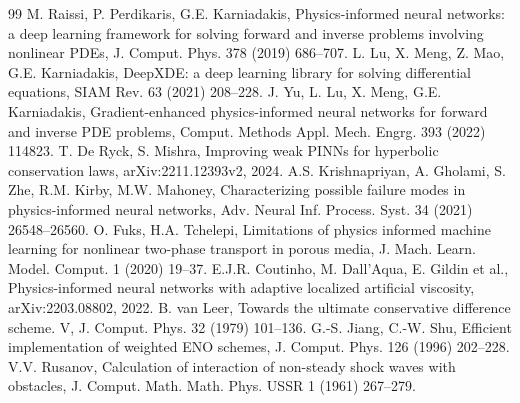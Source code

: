 \documentclass[11pt]{article}
\begin{document}
\begin{thebibliography}{99}
 M. Raissi, P. Perdikaris, G.E. Karniadakis, Physics-informed neural networks: a deep learning framework for solving forward and inverse problems involving nonlinear PDEs, J. Comput. Phys. 378 (2019) 686--707.
 L. Lu, X. Meng, Z. Mao, G.E. Karniadakis, DeepXDE: a deep learning library for solving differential equations, SIAM Rev. 63 (2021) 208--228.
 J. Yu, L. Lu, X. Meng, G.E. Karniadakis, Gradient-enhanced physics-informed neural networks for forward and inverse PDE problems, Comput. Methods Appl. Mech. Engrg. 393 (2022) 114823.
 T. De Ryck, S. Mishra, Improving weak PINNs for hyperbolic conservation laws, arXiv:2211.12393v2, 2024.
 A.S. Krishnapriyan, A. Gholami, S. Zhe, R.M. Kirby, M.W. Mahoney, Characterizing possible failure modes in physics-informed neural networks, Adv. Neural Inf. Process. Syst. 34 (2021) 26548--26560.
 O. Fuks, H.A. Tchelepi, Limitations of physics informed machine learning for nonlinear two-phase transport in porous media, J. Mach. Learn. Model. Comput. 1 (2020) 19--37.
 E.J.R. Coutinho, M. Dall'Aqua, E. Gildin et al., Physics-informed neural networks with adaptive localized artificial viscosity, arXiv:2203.08802, 2022.
 B. van Leer, Towards the ultimate conservative difference scheme. V, J. Comput. Phys. 32 (1979) 101--136.
 G.-S. Jiang, C.-W. Shu, Efficient implementation of weighted ENO schemes, J. Comput. Phys. 126 (1996) 202--228.
 V.V. Rusanov, Calculation of interaction of non-steady shock waves with obstacles, J. Comput. Math. Math. Phys. USSR 1 (1961) 267--279.
\end{thebibliography}
\end{document}
